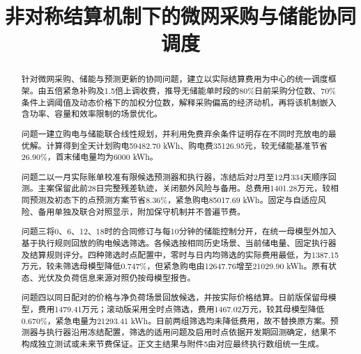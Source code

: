 \documentclass[withoutpreface,bwprint]{cumcmthesis}
\title{非对称结算机制下的微网采购与储能协同调度}
\begin{document}
\maketitle
\begin{abstract}
针对微网采购、储能与预测更新的协同问题，建立以实际结算费用为中心的统一调度框架。由五倍紧急补购及1.5倍上调收费，推导无储能单时段的80\%日前采购分位数、70\%条件上调阈值及动态价格下的加权分位数，解释采购偏高的经济动机，再将该机制嵌入含功率、容量和效率限制的场景优化。

问题一建立购电与储能联合线性规划，并利用免费弃余条件证明存在不同时充放电的最优解。计算得到全天计划购电59482.70 kWh、购电费35126.95元，较无储能基准节省26.90\%，首末储电量均为6000 kWh。

问题二以一月实际账单校准有限候选预测器和执行器，冻结后对2月至12月334天顺序回测。主案保留此前28日完整残差轨迹，关闭额外风险与备用。总费用1401.28万元，较相同预测及初态下的点预测方案节省8.36\%，紧急购电85017.69 kWh。固定与自适应风险、备用单独及联合对照显示，附加保守机制并不普遍节费。

问题三将0、6、12、18时的合同修订与每10分钟的储能控制分开，在统一母模型外加入基于执行规则回放的购电候选筛选。各候选按相同历史场景、当前储电量、固定执行器及结算规则评分。四种筛选时点配置中，零时与日内均筛选的实际费用最低，为1387.15万元，较未筛选母模型降低0.747\%，但紧急购电由12647.76增至21029.90 kWh。原有状态、光伏及负荷信息来源对照仍按母模型报告。

问题四以同日配对的价格与净负荷场景回放候选，并按实际价格结算。日前版保留母模型，费用1479.41万元；滚动版采用全时点筛选，费用1467.02万元，较其母模型降低0.670\%，紧急电量为21293.41 kWh。日前两组筛选均未降低费用，故不替换原方案。预测器与执行器沿用冻结配置，筛选的适用问题及启用时点依据开发期回测确定，结果不构成独立测试或未来节费保证。正文主结果与附件5由对应最终执行数组统一生成。

\end{abstract}


\FloatBarrier

\FloatBarrier

\FloatBarrier

\FloatBarrier

\FloatBarrier


\FloatBarrier
{}


\clearpage
\begin{appendices}

\end{appendices}
\end{document}
